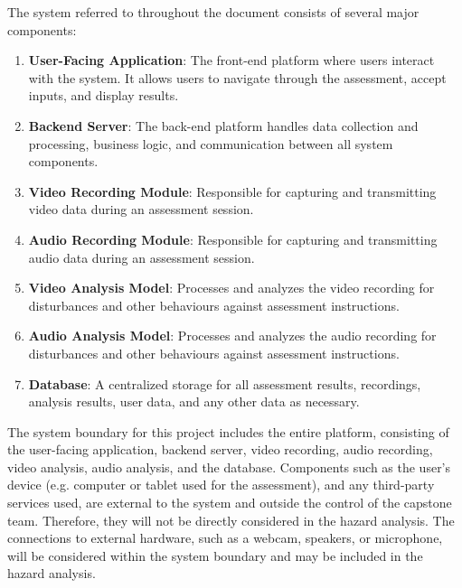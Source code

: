 \documentclass{article}
\begin{document}
The system referred to throughout the document consists of several major components: 
\begin{enumerate}
    \item \textbf{User-Facing Application}: The front-end platform where users interact with the system. It allows users to navigate through the assessment, accept inputs, and display results.
    \item \textbf{Backend Server}: The back-end platform handles data collection and processing, business logic, and communication between all system components.
    \item \textbf{Video Recording Module}: Responsible for capturing and transmitting video data during an assessment session.
    \item \textbf{Audio Recording Module}: Responsible for capturing and transmitting audio data during an assessment session.
    \item \textbf{Video Analysis Model}: Processes and analyzes the video recording for disturbances and other behaviours against assessment instructions.
    \item \textbf{Audio Analysis Model}: Processes and analyzes the audio recording for disturbances and other behaviours against assessment instructions.
    \item \textbf{Database}: A centralized storage for all assessment results, recordings, analysis results, user data, and any other data as necessary.
\end{enumerate}

The system boundary for this project includes the entire platform, consisting of the user-facing application, backend server, 
video recording, audio recording, video analysis, audio analysis, and the database. Components such as the user's device (e.g. computer or 
tablet used for the assessment), and any third-party services used, are external to the system and outside the control of 
the capstone team. Therefore, they will not be directly considered in the hazard analysis. The connections to external hardware, such as a webcam, speakers, or microphone,
will be considered within the system boundary and may be included in the hazard analysis.
\end{document}
